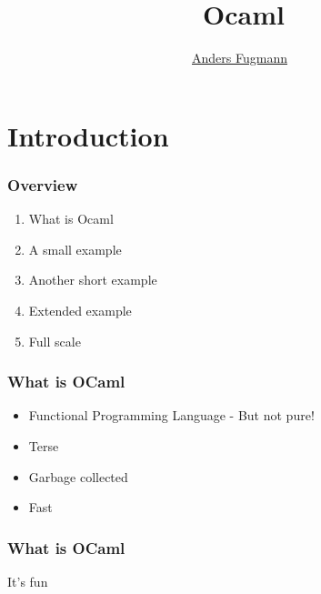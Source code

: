 \documentclass[mathserif,xcolor=svgnames]{beamer}
\renewcommand{\_}{\mathunderscore}
\begin{document}
\title[Introduction to OCaml]{\
  Ocaml
}
\author[Anders Fugmann]{\
  \normalfont \underline{Anders Fugmann}
}
\date{}

\maketitle

\section{Introduction}

\begin{frame}
  \frametitle{Overview}

  \begin{enumerate}
  \item What is Ocaml
  \item A small example
  \item Another short example
  \item Extended example
  \item Full scale
  \end{enumerate}

\end{frame}

\begin{frame}[fragile]
   \frametitle{What is OCaml}
   \begin{itemize}
   \item Functional Programming Language - But not pure!
   \item Terse
   \item Garbage collected
   \item Fast
   \end{itemize}
\end{frame}

\begin{frame}[fragile]
  \frametitle{What is OCaml}
  \begin{center}
    \Huge It's fun
  \end{center}
\end{frame}

\end{document}
